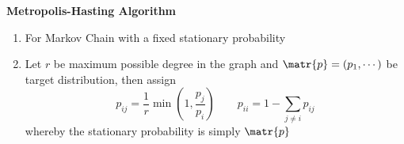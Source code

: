 \documentclass[11pt]{article}
\begin{document}
\begin{defn*}
    \textbf{Metropolis-Hasting Algorithm} 
    \begin{enumerate}
        \item For Markov Chain with a fixed stationary probability
        \item Let $r$ be maximum possible degree in the graph and $\matr{p}=(p_1,\cdots)$ be target distribution, then assign 
        \[
            p_{ij} = \frac{1}{r} \min (1, \frac{p_j}{p_i})
            \qquad 
            p_{ii} = 1 - \sum_{j\neq i} p_{ij}
        \]
        whereby the stationary probability is simply $\matr{p}$
    \end{enumerate}
\end{defn*}
\end{document}
